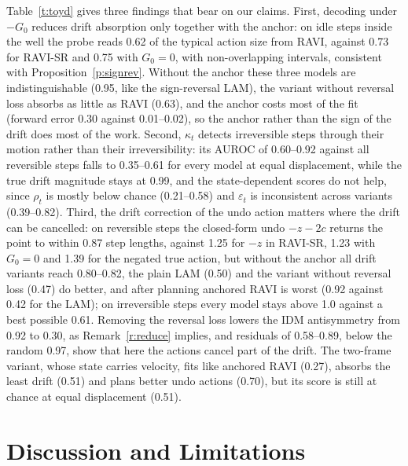 \documentclass{jcse}
\newcommand{\method}{RAVI}
\begin{document}
Table~\ref{t:toyd} gives three findings that bear on our claims.
First, decoding under $-G_0$ reduces drift absorption only together with the anchor: on idle steps inside the well the probe reads 0.62 of the typical action size from {\method}, against 0.73 for {\method}-SR and 0.75 with $G_0=0$, with non-overlapping intervals, consistent with Proposition~\ref{p:signrev}. Without the anchor these three models are indistinguishable (0.95, like the sign-reversal LAM), the variant without reversal loss absorbs as little as {\method} (0.63), and the anchor costs most of the fit (forward error 0.30 against 0.01--0.02), so the anchor rather than the sign of the drift does most of the work.
Second, $\kappa_t$ detects irreversible steps through their motion rather than their irreversibility: its AUROC of 0.60--0.92 against all reversible steps falls to 0.35--0.61 for every model at equal displacement, while the true drift magnitude stays at 0.99, and the state-dependent scores do not help, since $\rho_t$ is mostly below chance (0.21--0.58) and $\varepsilon_t$ is inconsistent across variants (0.39--0.82).
Third, the drift correction of the undo action matters where the drift can be cancelled: on reversible steps the closed-form undo $-z-2c$ returns the point to within 0.87 step lengths, against 1.25 for $-z$ in {\method}-SR, 1.23 with $G_0=0$ and 1.39 for the negated true action, but without the anchor all drift variants reach 0.80--0.82, the plain LAM (0.50) and the variant without reversal loss (0.47) do better, and after planning anchored {\method} is worst (0.92 against 0.42 for the LAM); on irreversible steps every model stays above 1.0 against a best possible 0.61.
Removing the reversal loss lowers the IDM antisymmetry from 0.92 to 0.30, as Remark~\ref{r:reduce} implies, and residuals of 0.58--0.89, below the random 0.97, show that here the actions cancel part of the drift. The two-frame variant, whose state carries velocity, fits like anchored {\method} (0.27), absorbs the least drift (0.51) and plans better undo actions (0.70), but its score is still at chance at equal displacement (0.51).

\section{Discussion and Limitations} \label{s:discussion}
\end{document}
